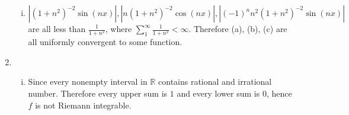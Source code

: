 \documentclass[11pt]{article}
\begin{document}
\begin{enumerate}[1]
\begin{enumerate}[(i)]
		\item
		$|(1+n^2)^{-2} \sin(n x)|, |n (1+n^2)^{-2} \cos(n x)|, |(-1)^n n^2 (1+n^2)^{-2} \sin(n x)|$
		are all less than $\frac{1}{1 + n^2}$, where $\sum_1^\infty \frac{1}{1 + n^2} < \infty$. Therefore (a), (b), (c) are all uniformly convergent to some function. 
	\end{enumerate}
	\item
	\begin{enumerate}[(i)]
		\item 
		Since every nonempty interval in $\mathbb{R}$ contains rational and irrational number. Therefore every upper sum is $1$ and every lower sum is $0$, hence $f$ is not Riemann integrable.  
	\end{enumerate}

\end{enumerate}
\end{document}
